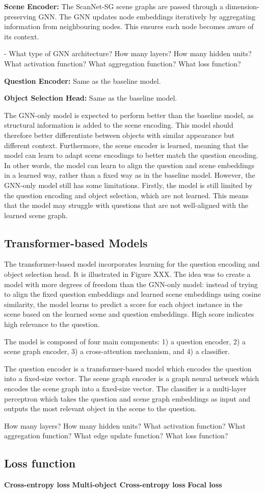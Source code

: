 \textbf{Scene Encoder:} The ScanNet-SG scene graphs are passed through a dimension-preserving GNN. The GNN updates node embeddings iteratively by aggregating information from neighbouring nodes. This ensures each node becomes aware of its context.

- What type of GNN architecture? How many layers? How many hidden units? What activation function? What aggregation function? What loss function?

\textbf{Question Encoder:} Same as the baseline model.

\textbf{Object Selection Head:} Same as the baseline model.

The GNN-only model is expected to perform better than the baseline model, as structural information is added to the scene encoding. This model should therefore better differentiate between objects with similar appearance but different context. Furthermore, the scene encoder is learned, meaning that the model can learn to adapt scene encodings to better match the question encoding. In other words, the model can learn to align the question and scene embeddings in a learned way, rather than a fixed way as in the baseline model. However, the GNN-only model still has some limitations. Firstly, the model is still limited by the question encoding and object selection, which are not learned. This means that the model may struggle  with questions that are not well-aligned with the learned scene graph.

\subsection{Transformer-based Models}

The transformer-based model incorporates learning for the question encoding and object selection head. It is illustrated in Figure XXX. The idea was to create a model with more degrees of freedom than the GNN-only model: instead of trying to align the fixed question embeddings and learned scene embeddings using cosine similarity, the model learns to predict a  score for each object instance in the scene based on the learned scene and question embeddings. High score indicates high relevance to the question.

The model is composed of four main components: 1) a question encoder, 2) a scene graph encoder, 3) a cross-attention mechanism, and 4) a classifier.

The question encoder is a transformer-based model which encodes the question into a fixed-size vector. The scene graph encoder is a graph neural network which encodes the scene graph into a fixed-size vector. The classifier is a multi-layer perceptron which takes the question and scene graph embeddings as input and outputs the most relevant object in the scene to the question.

How many layers? How many hidden units? What activation function? What aggregation function? What edge update function? What loss function?

\subsection{Loss function}

\textbf{Cross-entropy loss}
\textbf{Multi-object Cross-entropy loss}
\textbf{Focal loss}